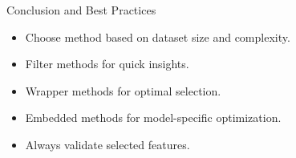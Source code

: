 \documentclass[11pt]{beamer}
\begin{document}
%
%
\begin{frame}{Conclusion and Best Practices}
    \begin{itemize}
        \item Choose method based on dataset size and complexity.
        \item Filter methods for quick insights.
        \item Wrapper methods for optimal selection.
        \item Embedded methods for model-specific optimization.
        \item Always validate selected features.
    \end{itemize}
\end{frame}
%
%
\end{document}

